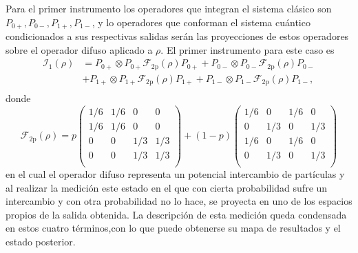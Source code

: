 Para el primer instrumento  los operadores que integran el sistema clásico son $P_{0+},P_{0-},P_{1+},P_{1-}$, y lo operadores que conforman el sistema cuántico condicionados a sus respectivas salidas serán las proyecciones de estos operadores sobre el operador difuso aplicado a $\rho$. El primer instrumento para este caso es \[\begin{split}\mathcal{I}_1(\rho)&=P_{0+}\otimes P_{0+}\mathcal{F}_{2\text{p}}(\rho)P_{0+}+P_{0-}\otimes P_{0-}\mathcal{F}_{2\text{p}}(\rho)P_{0-}\\
    &+ P_{1+}\otimes P_{1+}\mathcal{F}_{2\text{p}}(\rho)P_{1+}+P_{1-}\otimes P_{1-}\mathcal{F}_{2\text{p}}(\rho)P_{1-}, \\\end{split}\]donde \[\mathcal{F}_{2\text{p}}(\rho)= p\begin{pmatrix}
        1/6&1/6&0&0\\
        1/6&1/6&0&0\\
        0&0&1/3&1/3\\
        0&0&1/3&1/3\\
    \end{pmatrix}+ (1-p)\begin{pmatrix}
        1/6&0&1/6&0\\
        0&1/3&0&1/3\\
        1/6&0&1/6&0\\
        0&1/3&0&1/3\\
    \end{pmatrix}\] en el cual el operador difuso representa un potencial intercambio de partículas y al realizar la medición este estado en el que con cierta probabilidad sufre un intercambio y con otra probabilidad no lo hace,  se proyecta en uno de los espacios propios de la salida obtenida. La descripción de esta medición queda condensada en estos cuatro términos,con lo que puede obtenerse su mapa de resultados y el estado posterior. 
   
